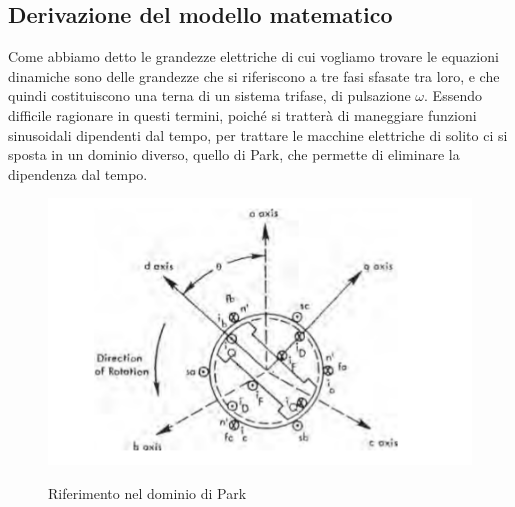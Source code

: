\documentclass[Lau,noexaminfo]{sapthesis}
\begin{document}
	\subsection{Derivazione del modello matematico}
	Come abbiamo detto le grandezze elettriche di cui vogliamo trovare le equazioni dinamiche sono delle grandezze che si riferiscono a tre fasi sfasate tra loro, e che quindi costituiscono una terna di un sistema trifase, di pulsazione $\omega$. Essendo difficile ragionare in questi termini, poiché si tratterà di maneggiare funzioni sinusoidali dipendenti dal tempo, per trattare le macchine elettriche di solito ci si sposta in un dominio diverso, quello di Park, che permette di eliminare la dipendenza dal tempo.\\
	\begin{figure}
	\centering
	\includegraphics[height=0.30\textheight]{riferimento}\\
	\caption{Riferimento nel dominio di Park}
	\end{figure}
\end{document}
